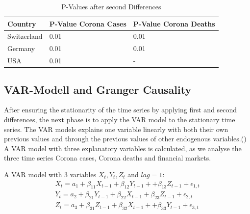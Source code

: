 \documentclass[11pt]{article}
\begin{document}
\begin{table}[h!]
\centering
\caption{P-Values after second Differences}
\label{tab:p-values-second-diff}
\begin{tabular}{|l|l|l|}
\hline
\textbf{Country} &\textbf{P-Value Corona Cases} & \textbf{P-Value Corona Deaths}  \\ \hline
Switzerland      & 0.01 & 0.01         \\ \hline
Germany          & 0.01 & 0.01             \\ \hline
USA              & 0.01 & -            \\ \hline
\end{tabular}
\end{table}

\subsection{VAR-Modell and Granger Causality}
After ensuring the stationarity of the time series by applying first and second differences, the next phase is to apply the VAR model to the stationary time series. The VAR models explains one variable linearly with both their own previous values and through the previous values of other endogenous variables.(\cite{PowerPoi49:online}) A VAR model with three explanatory variables is calculated, as we analyse the three time series Corona cases, Corona deaths and financial markets.

A VAR model with 3 variables $X_{t},Y_{t}, Z_{t}$ and $lag = 1$:
$$
\begin{array}{l}
X_{t}=a_{1}+\beta_{11} X_{t-1}+\beta_{12} Y_{t-1}++\beta_{13} Z_{t-1}+\epsilon_{1, t}\\
Y_{t}=a_{2}+\beta_{21} Y_{t-1}+\beta_{22} X_{t-1}+\beta_{23} Z_{t-1}+\epsilon_{2, t} \\
Z_{t}=a_{3}+\beta_{31} Z_{t-1}+\beta_{32} X_{t-1}++\beta_{33} Y_{t-1}+\epsilon_{3, t}
\end{array}
$$
\end{document}
